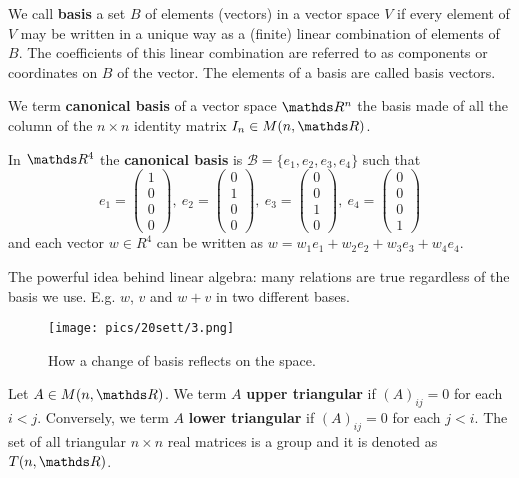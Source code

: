 \documentclass[computationalMathematics.tex]{subfiles}
\begin{document}
\begin{definition}[Basis]
  We call \textbf{basis} a set $B$ of elements (vectors) in a vector space $V$ if every element of $V$ may be written in a unique way as a (finite) linear combination of elements of $B$.
  The coefficients of this linear combination are referred to as components or coordinates on $B$ of the vector.
  The elements of a basis are called basis vectors.
\end{definition}

\begin{definition}
  We term \textbf{canonical basis} of a vector space $\R^n$ the basis made of all the column of the $n \times n$ identity matrix $I_n \in M(n, \R)$.
\end{definition}

\begin{example}
  In $\R^4$ the \textbf{canonical basis} is $ \mathcal{B} = \{ e_1, e_2, e_3, e_4\}$ such that
  \[
  e_1 = \begin{pmatrix} 1\\ 0\\ 0\\ 0 \end{pmatrix},~
  e_2 = \begin{pmatrix} 0\\ 1\\ 0\\ 0 \end{pmatrix},~
  e_3 = \begin{pmatrix} 0\\ 0\\ 1\\ 0 \end{pmatrix},~
  e_4 = \begin{pmatrix} 0\\ 0\\ 0\\ 1 \end{pmatrix}
\]
  and each vector $w \in R^4$ can be written as $w = w_1e_1 + w_2e_2 + w_3e_3 + w_4e_4$.
\end{example}
The powerful idea behind linear algebra: many relations are true
regardless of the basis we use. E.g. $w$, $v$ and $w + v$ in two different bases.
\begin{figure}[H]
    \centering
    \texttt{[image: pics/20sett/3.png]}
    \caption{How a change of basis reflects on the space.}\label{fig:20sett1}
\end{figure}

\begin{definition}
  Let $A \in M(n, \R)$. We term $A$ \textbf{upper triangular} if ${(A)}_{ij} =0$ for each $i<j$.
  Conversely, we term $A$ \textbf{lower triangular} if ${(A)}_{ij} =0$ for each $j<i$.
  The set of all triangular $n \times n$ real matrices is a group and it is denoted as $T(n, \R)$.
\end{definition}
\end{document}
